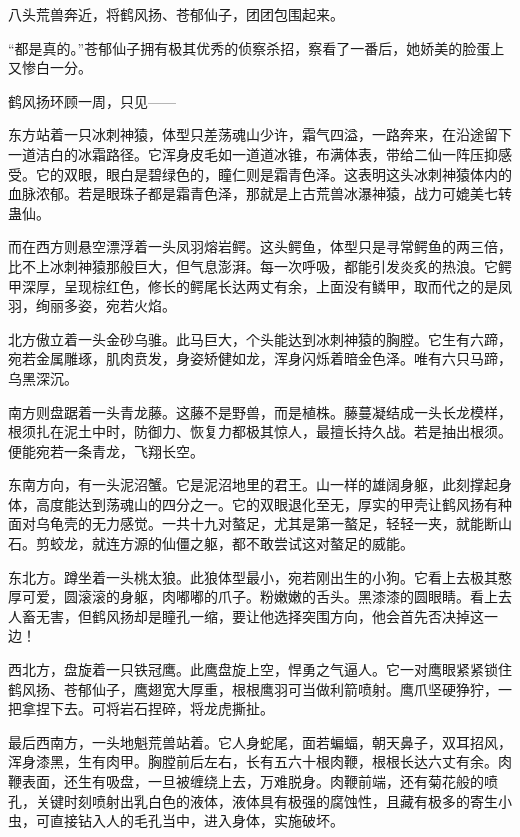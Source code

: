 
\begin{this_body}

八头荒兽奔近，将鹤风扬、苍郁仙子，团团包围起来。

“都是真的。”苍郁仙子拥有极其优秀的侦察杀招，察看了一番后，她娇美的脸蛋上又惨白一分。

鹤风扬环顾一周，只见——

东方站着一只冰刺神猿，体型只差荡魂山少许，霜气四溢，一路奔来，在沿途留下一道洁白的冰霜路径。它浑身皮毛如一道道冰锥，布满体表，带给二仙一阵压抑感受。它的双眼，眼白是碧绿色的，瞳仁则是霜青色泽。这表明这头冰刺神猿体内的血脉浓郁。若是眼珠子都是霜青色泽，那就是上古荒兽冰瀑神猿，战力可媲美七转蛊仙。

而在西方则悬空漂浮着一头凤羽熔岩鳄。这头鳄鱼，体型只是寻常鳄鱼的两三倍，比不上冰刺神猿那般巨大，但气息澎湃。每一次呼吸，都能引发炎炙的热浪。它鳄甲深厚，呈现棕红色，修长的鳄尾长达两丈有余，上面没有鳞甲，取而代之的是凤羽，绚丽多姿，宛若火焰。

北方傲立着一头金砂乌骓。此马巨大，个头能达到冰刺神猿的胸膛。它生有六蹄，宛若金属雕琢，肌肉贲发，身姿矫健如龙，浑身闪烁着暗金色泽。唯有六只马蹄，乌黑深沉。

南方则盘踞着一头青龙藤。这藤不是野兽，而是植株。藤蔓凝结成一头长龙模样，根须扎在泥土中时，防御力、恢复力都极其惊人，最擅长持久战。若是抽出根须。便能宛若一条青龙，飞翔长空。

东南方向，有一头泥沼蟹。它是泥沼地里的君王。山一样的雄阔身躯，此刻撑起身体，高度能达到荡魂山的四分之一。它的双眼退化至无，厚实的甲壳让鹤风扬有种面对乌龟壳的无力感觉。一共十九对螯足，尤其是第一螯足，轻轻一夹，就能断山石。剪蛟龙，就连方源的仙僵之躯，都不敢尝试这对螯足的威能。

东北方。蹲坐着一头桃太狼。此狼体型最小，宛若刚出生的小狗。它看上去极其憨厚可爱，圆滚滚的身躯，肉嘟嘟的爪子。粉嫩嫩的舌头。黑漆漆的圆眼睛。看上去人畜无害，但鹤风扬却是瞳孔一缩，要让他选择突围方向，他会首先否决掉这一边！

西北方，盘旋着一只铁冠鹰。此鹰盘旋上空，悍勇之气逼人。它一对鹰眼紧紧锁住鹤风扬、苍郁仙子，鹰翅宽大厚重，根根鹰羽可当做利箭喷射。鹰爪坚硬狰狞，一把拿捏下去。可将岩石捏碎，将龙虎撕扯。

最后西南方，一头地魁荒兽站着。它人身蛇尾，面若蝙蝠，朝天鼻子，双耳招风，浑身漆黑，生有肉甲。胸膛前后左右，长有五六十根肉鞭，根根长达六丈有余。肉鞭表面，还生有吸盘，一旦被缠绕上去，万难脱身。肉鞭前端，还有菊花般的喷孔，关键时刻喷射出乳白色的液体，液体具有极强的腐蚀性，且藏有极多的寄生小虫，可直接钻入人的毛孔当中，进入身体，实施破坏。


\end{this_body}
